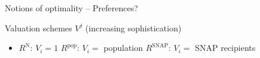 \documentclass[aspectratio=169, 11pt]{beamer}
\newcommand{\Rj}[1]{R^{\mathrm{#1}}}
\begin{document}
\begin{frame}{Notions of optimality -- Preferences?}

  \begin{block}{Valuation schemes $V^j$ (increasing sophistication)}
    \begin{itemize}
      \item $\Rj{N}$: $V_i = 1$ \quad $\Rj{pop}$: $V_i = $ population \quad $\Rj{SNAP}$: $V_i = $ SNAP recipients
    \end{itemize}
  \end{block}


\end{frame}
\end{document}
